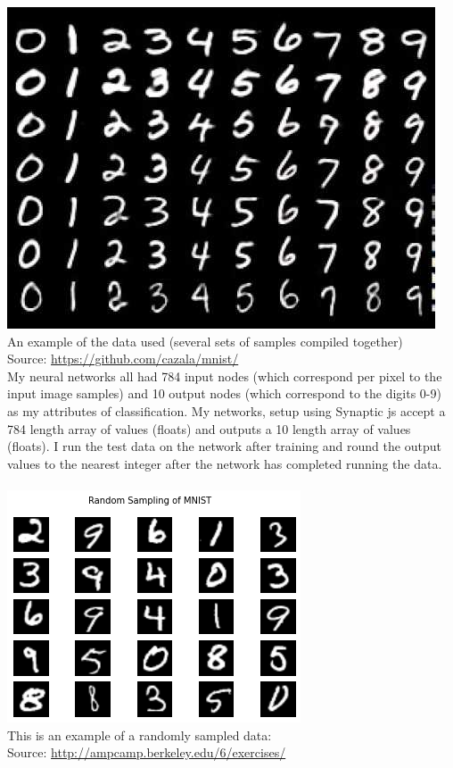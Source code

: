 \documentclass[11pt]{article}
\begin{document}
\begin{page}
\includegraphics[scale=0.7]{1}\\
An example of the data used (several sets of samples compiled together) \\
Source: \url{https://github.com/cazala/mnist/}\\

\noindent My neural networks all had 784 input nodes (which correspond per pixel to the input image samples) and 10 output nodes (which correspond to the digits 0-9) as my attributes of classification. My networks, setup using Synaptic js accept a 784 length array of values (floats) and outputs a 10 length array of values (floats). I run the test data on the network after training and round the output values to the nearest integer after the network has completed running the data. \\\\

\includegraphics{2}\\
This is an example of a randomly sampled data:\\
Source: \url{http://ampcamp.berkeley.edu/6/exercises/} 



\end{page}
\end{document}
